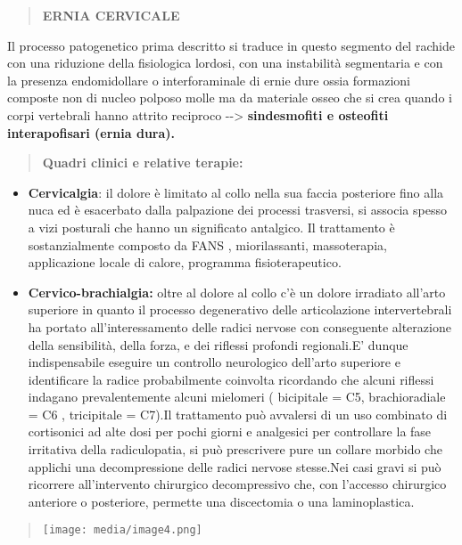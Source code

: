 \documentclass[]{article}
\begin{document}
\begin{quote}
\textbf{ERNIA CERVICALE}
\end{quote}

Il processo patogenetico prima descritto si traduce in questo segmento
del rachide con una riduzione della fisiologica lordosi, con una
instabilità segmentaria e con la presenza endomidollare o
interforaminale di ernie dure ossia formazioni composte non di nucleo
polposo molle ma da materiale osseo che si crea quando i corpi
vertebrali hanno attrito reciproco -\/-\textgreater{}
\textbf{sindesmofiti e osteofiti interapofisari (ernia dura).}

\begin{quote}
\textbf{Quadri clinici e relative terapie:}
\end{quote}

\begin{itemize}
\item
  \textbf{Cervicalgia}: il dolore è limitato al collo nella sua faccia
  posteriore fino alla nuca ed è esacerbato dalla palpazione dei
  processi trasversi, si associa spesso a vizi posturali che hanno un
  significato antalgico. Il trattamento è sostanzialmente composto da
  FANS , miorilassanti, massoterapia, applicazione locale di calore,
  programma fisioterapeutico.
\item
  \textbf{Cervico-brachialgia:} oltre al dolore al collo c'è un dolore
  irradiato all'arto superiore in quanto il processo degenerativo delle
  articolazione intervertebrali ha portato all'interessamento delle
  radici nervose con conseguente alterazione della sensibilità, della
  forza, e dei riflessi profondi regionali.E' dunque indispensabile
  eseguire un controllo neurologico dell'arto superiore e identificare
  la radice probabilmente coinvolta ricordando che alcuni riflessi
  indagano prevalentemente alcuni mielomeri ( bicipitale = C5,
  brachioradiale = C6 , tricipitale = C7).Il trattamento può avvalersi
  di un uso combinato di cortisonici ad alte dosi per pochi giorni e
  analgesici per controllare la fase irritativa della radiculopatia, si
  può prescrivere pure un collare morbido che applichi una
  decompressione delle radici nervose stesse.Nei casi gravi si può
  ricorrere all'intervento chirurgico decompressivo che, con l'accesso
  chirurgico anteriore o posteriore, permette una discectomia o una
  laminoplastica.
\end{itemize}

\begin{quote}
\texttt{[image: media/image4.png]}
\end{quote}
\end{document}
